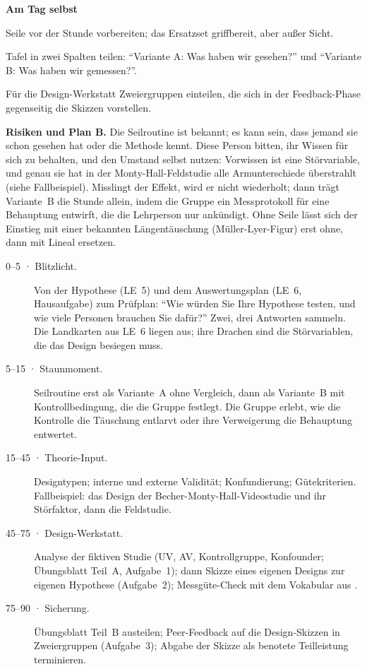 \begin{vorbereitung}
\textbf{Am Tag selbst}
\begin{checkliste}
  \item Seile vor der Stunde vorbereiten; das Ersatzset griffbereit, aber
    außer Sicht.
  \item Tafel in zwei Spalten teilen: \enquote{Variante A: Was haben wir
    gesehen?} und \enquote{Variante B: Was haben wir gemessen?}.
  \item Für die Design-Werkstatt Zweiergruppen einteilen, die sich in der
    Feedback-Phase gegenseitig die Skizzen vorstellen.
\end{checkliste}

\textbf{Risiken und Plan B.} Die Seilroutine ist bekannt; es kann sein,
dass jemand sie schon gesehen hat oder die Methode kennt. Diese Person
bitten, ihr Wissen für sich zu behalten, und den Umstand selbst nutzen:
Vorwissen ist eine Störvariable, und genau sie hat in der
Monty-Hall-Feldstudie alle Armunterschiede überstrahlt (siehe
Fallbeispiel). Misslingt der Effekt, wird er nicht wiederholt; dann
trägt Variante~B die Stunde allein, indem die Gruppe ein Messprotokoll für
eine Behauptung entwirft, die die Lehrperson nur ankündigt. Ohne Seile
lässt sich der Einstieg mit einer bekannten Längentäuschung
(Müller-Lyer-Figur) erst ohne, dann mit Lineal ersetzen.
\end{vorbereitung}

\begin{ablauf}
\begin{description}
\item[0--5 · Blitzlicht.] Von der Hypothese (LE~5) und dem
  Auswertungsplan (LE~6, Hausaufgabe) zum Prüfplan: \enquote{Wie würden
  Sie Ihre Hypothese testen, und wie viele Personen brauchen Sie dafür?}
  Zwei, drei Antworten sammeln. Die Landkarten aus LE~6 liegen aus; ihre
  Drachen sind die Störvariablen, die das Design besiegen muss.
\item[5--15 · Staunmoment.] Seilroutine erst als Variante~A ohne
  Vergleich, dann als Variante~B mit Kontrollbedingung, die die Gruppe
  festlegt. Die Gruppe erlebt, wie die Kontrolle die Täuschung entlarvt
  oder ihre Verweigerung die Behauptung entwertet.
\item[15--45 · Theorie-Input.] Designtypen; interne und externe
  Validität; Konfundierung; Gütekriterien. Fallbeispiel: das Design der
  Becher-Monty-Hall-Videostudie und ihr Störfaktor, dann die Feldstudie.
\item[45--75 · Design-Werkstatt.] Analyse der fiktiven Studie (UV, AV,
  Kontrollgruppe, Konfounder; Übungsblatt Teil~A, Aufgabe~1); dann
  Skizze eines eigenen Designs zur eigenen Hypothese (Aufgabe~2);
  Messgüte-Check mit
  dem Vokabular aus .
\item[75--90 · Sicherung.] Übungsblatt Teil~B austeilen; Peer-Feedback
  auf die Design-Skizzen in Zweiergruppen (Aufgabe~3); Abgabe der Skizze
  als benotete Teilleistung terminieren.
\end{description}
\end{ablauf}

